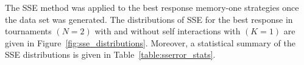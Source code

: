 The SSE method was applied to the best response memory-one strategies once the
data set was generated. The distributions of SSE for the best response in
tournaments \((N = 2)\) with and without self interactions with \((K = 1)\) are
given in Figure~\ref{fig:sse_distributions}. Moreover, a statistical summary of
the SSE distributions is given in Table~\ref{table:sserror_stats}.

\begin{table}[!htbp]
    \begin{center}
    \end{center}
    \caption{SSE of best response memory-one for \(N=2\).}\label{table:sserror_stats}
\end{table}

